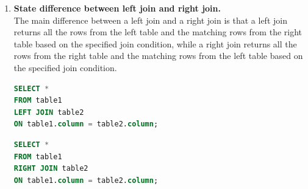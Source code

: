 \documentclass[11pt]{article}
\begin{document}
\begin{enumerate}
	\item \textbf{State difference between left join and right join.}\\

	      The main difference between a left join and a right join is that a left join returns all the rows from the left table and the matching rows from the right table based on the specified join condition, while a right join returns all the rows from the right table and the matching rows from the left table based on the specified join condition.

	      \begin{lstlisting}[language=sql]
SELECT *
FROM table1
LEFT JOIN table2
ON table1.column = table2.column;
\end{lstlisting}

	      \begin{lstlisting}[language=sql]
SELECT *
FROM table1
RIGHT JOIN table2
ON table1.column = table2.column;
	\end{lstlisting}

\end{enumerate}
\end{document}
